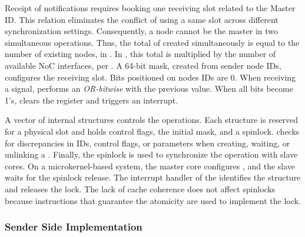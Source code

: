 				Receipt of notifications requires booking one \cnoc receiving slot
				related to the Master ID. This relation eliminates the conflict of
				using a same slot across different synchronization settings.
				Consequently, a node cannot be the master in two simultaneous operations.
				Thus, the total of \sync created simultaneously is equal to the number
				of existing nodes,  in \mppa. In \ioclusters, this total is
				multiplied by the number of available NoC interfaces,  per \dma.
				A 64-bit mask, created from sender node IDs, configures the receiving
				slot. Bits positioned on nodes IDs are 0. When receiving a signal,
				\dma performs an \textit{OR-bitwise} with the previous value. When
				all bits become 1's, \dma clears the register and triggers an interrupt.

				A vector of internal structures controls the operations. Each structure
				is reserved for a physical slot and holds control flags, the initial mask,
				and a spinlock. \hal checks for discrepancies in IDs, control flags, or
				parameters when creating, waiting, or unlinking a \sync. Finally,
				the spinlock is used to synchronize the operation with slave cores.
				On a microkernel-based system, the master core configures \sync, and
				the slave waits for the spinlock release. The interrupt handler of the
				\sync identifies the structure and releases the lock. The lack of cache
				coherence does not affect spinlocks because instructions that guarantee
				the atomicity are used to implement the lock.


			\subsubsection{Sender Side Implementation}



